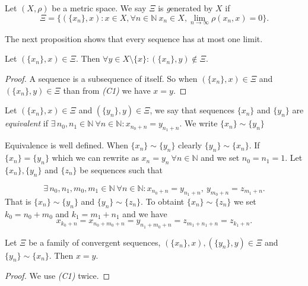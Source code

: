 \begin{define}\label{def:gen}
Let $(X,\rho)$ be a metric space. We say $\Xi$ is {\emph generated by} $X$ if 
\[
	\Xi=\{(\{x_n\},x): x\in X, \forall n\in \mathbb{N}\ x_n\in X, \lim_{n \to \infty} \rho(x_n,x)=0\}.
\]
\end{define}

The next proposition shows that every sequence has at most one limit.

\begin{theorem} \label{th:onelim}
Let $(\{x_n\},x)\in\Xi$. Then $\forall y\in X\setminus\{x\}: (\{x_n\},y)\notin\Xi$.
\end{theorem} 
\begin{proof} 
	A sequence is a subsequence of itself. So when $(\{x_n\},x)\in\Xi$ and $(\{x_n\},y)\in\Xi$ than from \emph{(C1)} we have $x=y$.
\end{proof}

\begin{define}\label{def:ekv}
Let $(\{x_n\},x)\in\Xi$ and $(\{y_n\},y)\in\Xi$, we say that sequences $\{x_n\}$ and $\{y_n\}$ are \emph{equivalent} if $\exists\, n_0, n_1 \in \mathbb{N}\ \forall n \in \mathbb{N}: x_{n_0+n}=y_{n_1+n}$. We write $\{x_n\} \sim \{y_n\}$
\end{define}

Equivalence is well defined. When $\{x_n\} \sim \{y_n\}$ clearly $\{y_n\} \sim \{x_n\}$.
If $\{x_n\} = \{y_n\}$ which we can rewrite as $x_n = y_n\ \forall n \in \mathbb{N}$ and we set $n_0 = n_1 = 1$. Let $\{x_n\}, \{y_n\}$ and $\{z_n\}$ be sequences such that

\[
	\exists\, n_0, n_1, m_0, m_1 \in \mathbb{N}\ \forall n \in \mathbb{N}: x_{n_0+n}=y_{n_1+n},\ y_{m_0+n}=z_{m_1+n}.
\]
That is $\{x_n\} \sim \{y_n\}$ and $\{y_n\} \sim \{z_n\}$.  To obtaint $\{x_n\} \sim \{z_n\}$ we set $k_0=n_0+m_0$ and $k_1=m_1+n_1$ and we have
\[
	x_{k_0+n}=x_{n_0+m_0+n}=y_{n_1+m_0+n}=z_{m_1+n_1+n}=z_{k_1+n}.
\]


\begin{theorem} \label{th:eqseq}
Let $\Xi$ be a family of convergent sequences, $(\{x_n\},x), (\{y_n\},y)\in\Xi$ and $\{y_n\} \sim \{x_n\}$. Then $x=y$.
\end{theorem} 
\begin{proof}
We use \emph{(C1)} twice.
\end{proof}

